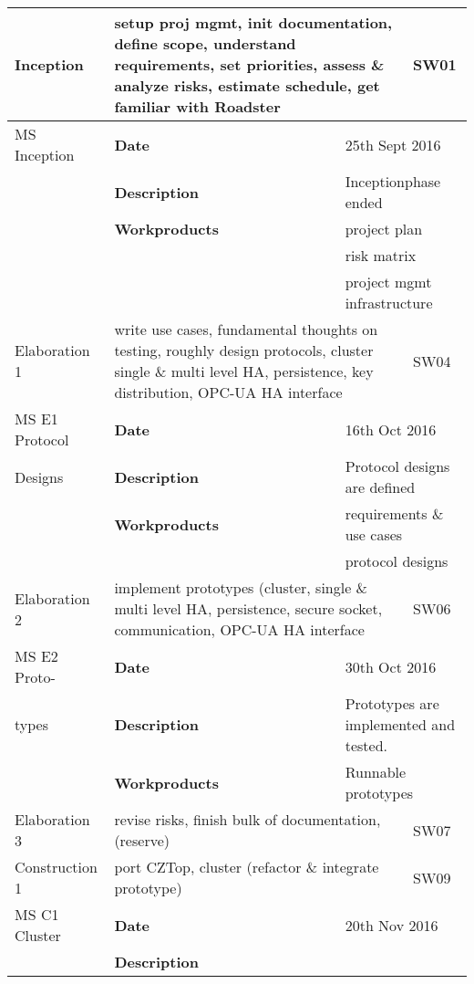 \begin{center}
\begin{longtable}{|p{25mm}|p{25mm} p{45mm}|p{10mm}|}
    \hline
    \endlastfoot
	Inception
		& \multicolumn{2}{p{70mm}|}{setup proj mgmt, init documentation, define scope, understand requirements,
		set priorities, assess \& analyze risks, estimate schedule, get familiar with Roadster}
		& SW01 \\ \hline
	MS Inception
		& \textbf{Date}
		& \multicolumn{2}{l|}{25th Sept 2016} \\
		& \textbf{Description}
		& \multicolumn{2}{l|}{Inceptionphase ended} \\
		& \textbf{Workproducts}
		& \multicolumn{2}{l|}{project plan} \\
		& & \multicolumn{2}{l|}{risk matrix} \\
		& & \multicolumn{2}{l|}{project mgmt infrastructure} \\ \hline
	Elaboration 1
		& \multicolumn{2}{p{70mm}|}{write use cases, fundamental thoughts on testing, roughly design protocols,
		cluster single \& multi level HA, persistence, key distribution, OPC-UA HA interface}
		& SW04 \\ \hline
	MS E1 Protocol
		& \textbf{Date}
		& \multicolumn{2}{l|}{16th Oct 2016} \\
		Designs & \textbf{Description}
		& \multicolumn{2}{l|}{Protocol designs are defined} \\
		& \textbf{Workproducts}
		& \multicolumn{2}{l|}{requirements \& use cases} \\
		& & \multicolumn{2}{l|}{protocol designs} \\ \hline
	Elaboration 2
		& \multicolumn{2}{p{70mm}|}{implement prototypes (cluster, single \& multi level HA, persistence, secure socket, 
		communication, OPC-UA HA interface}
		& SW06 \\ \hline
	MS E2 Proto-
		& \textbf{Date}
		& \multicolumn{2}{l|}{30th Oct 2016} \\
	types & \textbf{Description}
		& \multicolumn{2}{l|}{Prototypes are implemented and tested.} \\
		& \textbf{Workproducts}
		& \multicolumn{2}{l|}{Runnable prototypes} \\ \hline
	Elaboration 3
		& \multicolumn{2}{p{70mm}|}{revise risks, finish bulk of documentation, (reserve)}
		& SW07 \\ \hline
	Construction 1
		& \multicolumn{2}{p{70mm}|}{port CZTop, cluster (refactor \& integrate prototype)}
		& SW09 \\ \hline
	MS C1 Cluster
		& \textbf{Date}
		& \multicolumn{2}{l|}{20th Nov 2016} \\
		& \textbf{Description}

\end{longtable}
\end{center}
